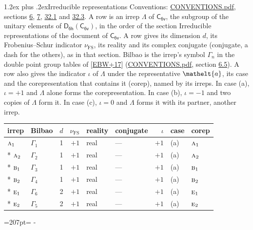 \documentclass[10pt,a4paper]{article}
\makeatletter
\renewcommand\section{\@startsection{section}{1}{\z@}{-3ex plus -1ex minus -.2ex}%
  {1.2ex plus .2ex}{\normalfont\large\sffamily\bfseries\color{parttitle}}}
\newcommand{\needspace}[1]{\par\penalty-100\begingroup\dimen0=#1\relax\dimen2=\pagegoal
  \advance\dimen2-\pagetotal\ifdim\dimen0>\dimen2\relax\ifdim\dimen2>0pt\vfil\break\fi\fi
  \endgroup}
\numberwithin{equation}{section}
\newcommand{\eltfont}[1]{{\let\sigma\eltsigma\mathelt{#1}}}
\newcommand{\grp}[1]{\mathsf{#1}}
\newcommand{\irr}[1]{\text{\normalfont\scshape #1}}
\newcommand{\elt}[1]{\eltfont{#1}}
\newcommand{\fsind}{\nu_{\mathrm{FS}}}
\makeatother
\begin{document}
\section{Irreducible representations}\label{s:irreps}
Conventions: \href{../../CONVENTIONS.pdf}{CONVENTIONS.pdf}, sections \href{../../../rotation/CONVENTIONS.pdf\#conv.6}{6}, \href{../../../rotation/CONVENTIONS.pdf\#conv.7}{7}, \href{../../CONVENTIONS.pdf\#conv.32.1}{32.1} and \href{../../CONVENTIONS.pdf\#conv.32.3}{32.3}.
\leavevmode\label{n:irrep.Delta}A row is an irrep $\Lambda$ of $\grp{C_{6v}}$, the subgroup of the unitary elements of $\grp{D_{6h}}(\grp{C_{6v}})$, in the order of the section Irreducible representations of the document of \href{../../../rotation/data/pdf/C6v.pdf}{$\grp{C_{6v}}$}. \label{n:index.dimension}\label{n:index.frobenius}\label{n:head.irrep}\label{n:head.reality}\label{n:head.conjugate}A row gives its dimension $d$, its Frobenius--Schur indicator $\fsind$, its reality and its complex conjugate (conjugate, a dash for the others), as in that section. \label{n:head.bilbao}\label{n:irrep.alias.gamma}Bilbao is the irrep's symbol $\Gamma_n$ in the double point group tables of [\href{../../../REFERENCES.pdf\#ref.EBW+17}{EBW+17}] (\href{../../CONVENTIONS.pdf}{CONVENTIONS.pdf}, section \href{../../../rotation/CONVENTIONS.pdf\#conv.6.5}{6.5}). \label{n:head.case.corep}\label{n:head.corep}A row also gives the indicator $\iota$ of $\Lambda$ under the representative $\elt{a}$, its case and the corepresentation that contains it (corep), named by its irreps. In case (a), $\iota = +1$ and $\Lambda$ alone forms the corepresentation. In case (b), $\iota = -1$ and two copies of $\Lambda$ form it. In case (c), $\iota = 0$ and $\Lambda$ forms it with its partner, another irrep.
\setlength{\emergencystretch}{2em}\par\setlength{\emergencystretch}{0pt}
{\small\renewcommand{\arraystretch}{1.25}\setlength{\tabcolsep}{4pt}\begin{longtable}{@{}llrrllrll@{}}\toprule
irrep & Bilbao & $d$ & $\fsind$ & reality & conjugate & $\iota$ & case & corep\\\midrule\endhead
\bottomrule\endfoot\endlastfoot
$\irr{a}_{1}$ & $\Gamma_{1}$ & 1 & $+1$ & real & --- & $+1$ & (a) & $\irr{a}_{1}$\\*
$\irr{a}_{2}$ & $\Gamma_{2}$ & 1 & $+1$ & real & --- & $+1$ & (a) & $\irr{a}_{2}$\\*
$\irr{b}_{1}$ & $\Gamma_{3}$ & 1 & $+1$ & real & --- & $+1$ & (a) & $\irr{b}_{1}$\\*
$\irr{b}_{2}$ & $\Gamma_{4}$ & 1 & $+1$ & real & --- & $+1$ & (a) & $\irr{b}_{2}$\\*
$\irr{e}_{1}$ & $\Gamma_{6}$ & 2 & $+1$ & real & --- & $+1$ & (a) & $\irr{e}_{1}$\\*
$\irr{e}_{2}$ & $\Gamma_{5}$ & 2 & $+1$ & real & --- & $+1$ & (a) & $\irr{e}_{2}$\\
\bottomrule\end{longtable}}
\needspace{207pt}
\end{document}
